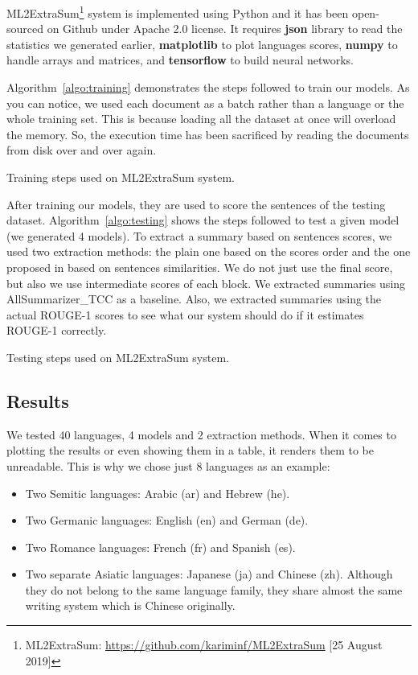 ML2ExtraSum\footnote{ML2ExtraSum: \url{https://github.com/kariminf/ML2ExtraSum} [25 August 2019]} system is implemented using Python and it has been open-sourced on Github under Apache 2.0 license. 
It requires \textbf{json} library to read the statistics we generated earlier, \textbf{matplotlib} to plot languages scores, \textbf{numpy} to handle arrays and matrices, and \textbf{tensorflow} to build neural networks. 

Algorithm~\ref{algo:training} demonstrates the steps followed to train our models. 
As you can notice, we used each document as a batch rather than a language or the whole training set. 
This is because loading all the dataset at once will overload the memory. 
So, the execution time has been sacrificed by reading the documents from disk over and over again. 
\begin{algorithm}[!ht]
	\caption{Training steps used on ML2ExtraSum system.}
	\label{algo:training}
\end{algorithm}


After training our models, they are used to score the sentences of the testing dataset. 
Algorithm~\ref{algo:testing} shows the steps followed to test a given model (we generated 4 models). 
To extract a summary based on sentences scores, we used two extraction methods: the plain one based on the scores order and the one proposed in \citep{15-aries-al} based on sentences similarities. 
We do not just use the final score, but also we use intermediate scores of each block. 
We extracted summaries using AllSummarizer\_TCC \citep{13-aries-al,15-aries-al} as a baseline. 
Also, we extracted summaries using the actual ROUGE-1 scores to see what our system should do if it estimates ROUGE-1 correctly. 
\begin{algorithm}[!ht]
	\caption{Testing steps used on ML2ExtraSum system.}
	\label{algo:testing}
\end{algorithm}


\subsection{Results}

We tested 40 languages, 4 models and 2 extraction methods. 
When it comes to plotting the results or even showing them in a table, it renders them to be unreadable.  
This is why we chose just 8 languages as an example:
\begin{itemize}
	\item Two Semitic languages: Arabic (ar) and Hebrew (he).
	\item Two Germanic languages: English (en) and German (de).
	\item Two Romance languages: French (fr) and Spanish (es).
	\item Two separate Asiatic languages: Japanese (ja) and Chinese (zh). Although they do not belong to the same language family, they share almost the same writing system which is Chinese originally. 
\end{itemize}

